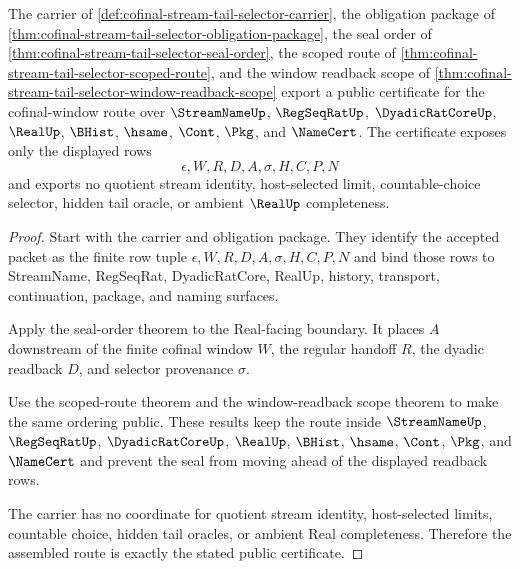 \begin{theorem}
\label{thm:cofinal-stream-tail-selector-public-certificate}
The carrier of \autoref{def:cofinal-stream-tail-selector-carrier}, the obligation package of \autoref{thm:cofinal-stream-tail-selector-obligation-package}, the seal order of \autoref{thm:cofinal-stream-tail-selector-seal-order}, the scoped route of \autoref{thm:cofinal-stream-tail-selector-scoped-route}, and the window readback scope of \autoref{thm:cofinal-stream-tail-selector-window-readback-scope} export a public certificate for the cofinal-window route over $\StreamNameUp$, $\RegSeqRatUp$, $\DyadicRatCoreUp$, $\RealUp$, $\BHist$, $\hsame$, $\Cont$, $\Pkg$, and $\NameCert$. The certificate exposes only the displayed rows
$$
\epsilon,W,R,D,A,\sigma,H,C,P,N
$$
and exports no quotient stream identity, host-selected limit, countable-choice selector, hidden tail oracle, or ambient $\RealUp$ completeness.
\end{theorem}
\begin{proof}
Start with the carrier and obligation package. They identify the accepted packet as the finite row tuple $\epsilon,W,R,D,A,\sigma,H,C,P,N$ and bind those rows to StreamName, RegSeqRat, DyadicRatCore, RealUp, history, transport, continuation, package, and naming surfaces.

Apply the seal-order theorem to the Real-facing boundary. It places $A$ downstream of the finite cofinal window $W$, the regular handoff $R$, the dyadic readback $D$, and selector provenance $\sigma$.

Use the scoped-route theorem and the window-readback scope theorem to make the same ordering public. These results keep the route inside $\StreamNameUp$, $\RegSeqRatUp$, $\DyadicRatCoreUp$, $\RealUp$, $\BHist$, $\hsame$, $\Cont$, $\Pkg$, and $\NameCert$ and prevent the seal from moving ahead of the displayed readback rows.

The carrier has no coordinate for quotient stream identity, host-selected limits, countable choice, hidden tail oracles, or ambient Real completeness. Therefore the assembled route is exactly the stated public certificate.
\end{proof}

